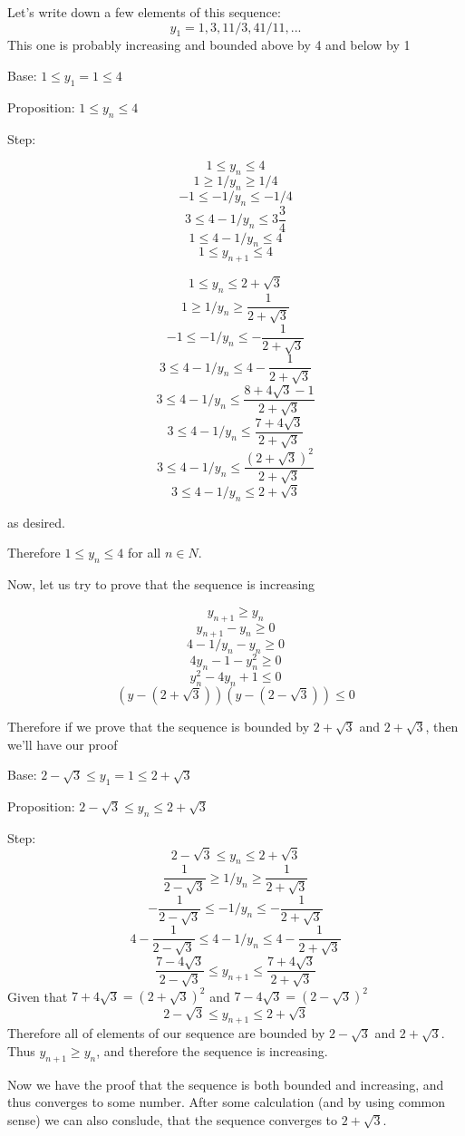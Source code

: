 \documentclass[11pt,oneside,titlepage]{book}
\begin{document}
Let's write down a few elements of this sequence:
$$y_1 = 1, 3, 11/3, 41/11, ...$$
This one is probably increasing and bounded above by 4 and below by 1

Base: $1 \leq y_1 = 1 \leq 4$

Proposition: $1 \leq y_n \leq 4$

Step:

$$1 \leq y_n \leq 4$$
$$1 \geq 1/y_n \geq 1/4$$
$$-1 \leq -1/y_n \leq -1/4$$
$$3 \leq 4 - 1/y_n \leq 3 \frac{3}{4}$$
$$1 \leq 4 - 1/y_n \leq 4$$
$$1 \leq y_{n + 1} \leq 4$$


$$1 \leq y_n \leq 2 + \sqrt{3}$$
$$1 \geq 1/y_n \geq \frac{1}{2 + \sqrt{3}}$$
$$-1 \leq -1/y_n \leq -\frac{1}{2 + \sqrt{3}}$$
$$3 \leq 4 - 1/y_n \leq 4  -\frac{1}{2 + \sqrt{3}}$$
$$3 \leq 4 - 1/y_n \leq \frac{8 + 4 \sqrt{3} - 1}{2 + \sqrt{3}}$$
$$3 \leq 4 - 1/y_n \leq \frac{7 + 4 \sqrt{3}}{2 + \sqrt{3}}$$
$$3 \leq 4 - 1/y_n \leq \frac{(2 + \sqrt{3})^2}{2 + \sqrt{3}}$$
$$3 \leq 4 - 1/y_n \leq 2 + \sqrt{3}$$

as desired.

Therefore $1 \leq y_n \leq 4$ for all $n \in N$.

Now, let us try to prove that the sequence is increasing

$$y_{n + 1} \geq y_n $$
$$y_{n + 1} - y_n \geq 0 $$
$$4 - 1/y_n - y_n \geq 0 $$
$$4y_n - 1 - y_n^2 \geq 0 $$
$$y_n^2 - 4 y_n + 1 \leq 0 $$
$$(y - (2 + \sqrt{3}))(y - (2 - \sqrt{3})) \leq 0 $$

Therefore  if we prove that the sequence is bounded by $2 + \sqrt{3}$ and
$2 + \sqrt{3}$, then we'll have our proof

Base: $2 - \sqrt{3} \leq y_1 = 1 \leq 2 + \sqrt{3}$

Proposition: $2 - \sqrt{3} \leq y_n \leq 2 + \sqrt{3}$

Step:
$$2 - \sqrt{3} \leq y_n \leq 2 + \sqrt{3}$$
$$\frac{1}{2 - \sqrt{3}} \geq 1/y_n \geq \frac{1}{2 + \sqrt{3}}$$
$$-\frac{1}{2 - \sqrt{3}} \leq -1/y_n \leq - \frac{1}{2 + \sqrt{3}}$$
$$4 -\frac{1}{2 - \sqrt{3}} \leq 4  -1/y_n \leq 4 - \frac{1}{2 + \sqrt{3}}$$
$$\frac{7 - 4 \sqrt{3}}{2 - \sqrt{3}} \leq y_{n + 1} \leq \frac{7 + 4 \sqrt{3}}{2 + \sqrt{3}}$$
Given that $7 + 4 \sqrt{3} = (2 + \sqrt{3})^2$ and $7 - 4 \sqrt{3} = (2 - \sqrt{3})^2$ 
$$2 - \sqrt{3} \leq y_{n + 1} \leq 2 + \sqrt{3}$$
Therefore all of elements of our sequence are bounded by $2 - \sqrt{3}$ and
$2 + \sqrt{3}$. Thus $y_{n + 1} \geq y_n$, and therefore the sequence is increasing.

Now we have the proof that the sequence is both bounded and increasing, and thus
converges to some number. After some calculation (and by using common sense) we can
also conslude, that the sequence converges to $2 + \sqrt{3}$.
\end{document}
